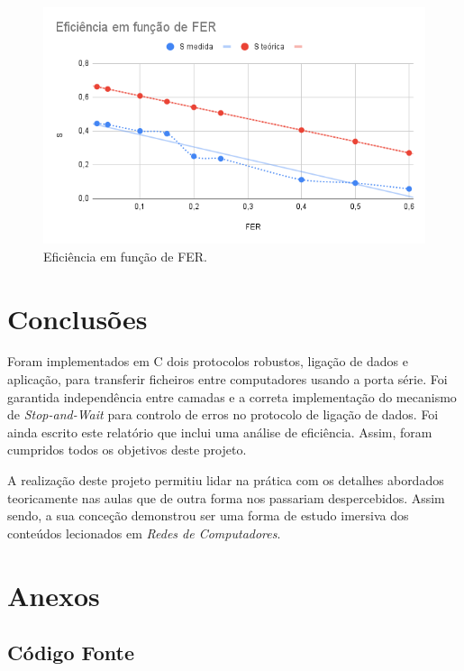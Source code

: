 \documentclass[a4paper,11pt,portuguese]{article}
\begin{document}
    \begin{figure}[H]
        \centering
        \includegraphics[scale=0.4]{./imgs/fer.png}
        \caption{Eficiência em função de FER.}
        \label{fig:fer}
    \end{figure}


\section{Conclusões}

    Foram implementados em C dois protocolos robustos, ligação de dados e aplicação, para
    transferir ficheiros entre computadores usando a porta série. Foi garantida
    independência entre camadas e a correta implementação do mecanismo de
    \textit{Stop-and-Wait} para controlo de erros no protocolo de ligação
    de dados. Foi ainda escrito este relatório que inclui uma análise de eficiência.
    Assim, foram cumpridos todos os objetivos deste projeto. \par

    A realização deste projeto permitiu lidar na prática com os detalhes abordados
    teoricamente nas aulas que de outra forma nos passariam despercebidos. Assim sendo,
    a sua conceção demonstrou ser uma forma de estudo imersiva dos conteúdos lecionados
    em \textit{Redes de Computadores}.


\newpage

\section{Anexos}
\subsection{Código Fonte}
\end{document}
